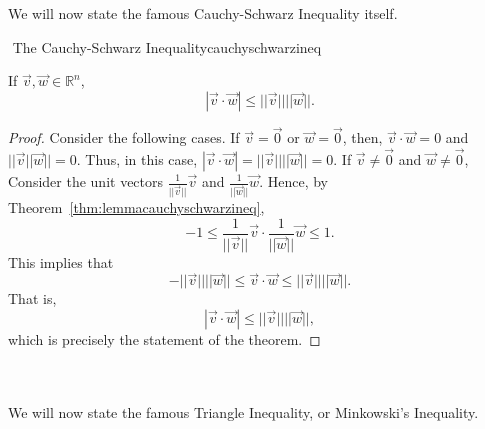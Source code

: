         \pagebreak
        \vphantom
        \\
        \\
        We will now state the famous Cauchy-Schwarz Inequality itself.
        \begin{theorem}{\Stop\,\,The Cauchy-Schwarz Inequality}{cauchyschwarzineq}

            If \(\vec{v},\vec{w}\in\mathbb{R}^n\), 
            \begin{equation*}
                |\vec{v}\cdot\vec{w}|\leq||\vec{v}||||\vec{w}||.
            \end{equation*}
            \begin{proof}
                Consider the following cases. If \(\vec{v}=\vec{0}\) or \(\vec{w}=\vec{0}\), then, \(\vec{v}\cdot\vec{w}=0\) and \(||\vec{v}||\vec{w}||=0\). Thus, in this case, \(|\vec{v}\cdot\vec{w}|=||\vec{v}||||\vec{w}||=0\). If \(\vec{v}\neq\vec{0}\) and \(\vec{w}\neq\vec{0}\), Consider the unit vectors \(\frac{1}{||\vec{v}||}\vec{v}\) and \(\frac{1}{||\vec{w}||}\vec{w}\). Hence, by Theorem~\ref{thm:lemmacauchyschwarzineq}, 
                \begin{equation*}
                    -1\leq \frac{1}{||\vec{v}||}\vec{v}\cdot \frac{1}{||\vec{w}||}\vec{w} \leq 1.
                \end{equation*}
                This implies that 
                \begin{equation*}
                    -||\vec{v}||||\vec{w}||\leq\vec{v}\cdot\vec{w}\leq||\vec{v}||||\vec{w}||.
                \end{equation*}
                That is,
                \begin{equation*}
                    |\vec{v}\cdot\vec{w}|\leq||\vec{v}||||\vec{w}||,
                \end{equation*}
                which is precisely the statement of the theorem.
            \end{proof}
            
        \end{theorem}
        \vphantom
        \\
        \\
        We will now state the famous Triangle Inequality, or Minkowski's Inequality.

